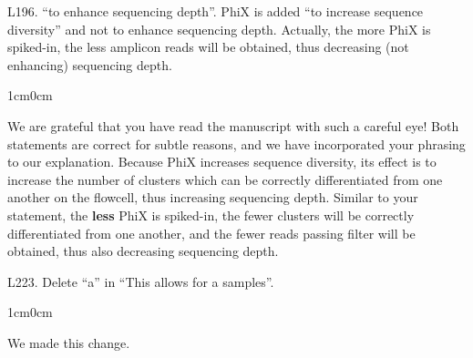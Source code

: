 \documentclass{article}
\newenvironment{response}
	{
	\begin{adjustwidth}{1cm}{0cm}
	\color{peerjBlue}
	}
	{
	\end{adjustwidth}
	}
\begin{document}
L196. ``to enhance sequencing depth''. PhiX is added ``to increase sequence diversity'' and not to enhance sequencing depth. Actually, the more PhiX is spiked-in, the less amplicon reads will be obtained, thus decreasing (not enhancing) sequencing depth.
\begin{response}
  We are grateful that you have read the manuscript with such a careful eye!
	Both statements are correct for subtle reasons, and we have incorporated your phrasing to our explanation.
	Because PhiX increases sequence diversity, its effect is to increase the number of clusters which can be correctly differentiated from one another on the flowcell, thus increasing sequencing depth.
	Similar to your statement, the \textbf{less} PhiX is spiked-in, the fewer clusters will be correctly differentiated from one another, and the fewer reads passing filter will be obtained, thus also decreasing sequencing depth.\\
\end{response}

L223. Delete ``a'' in ``This allows for a samples''.
\begin{response}
  We made this change.\\
\end{response}
\end{document}
